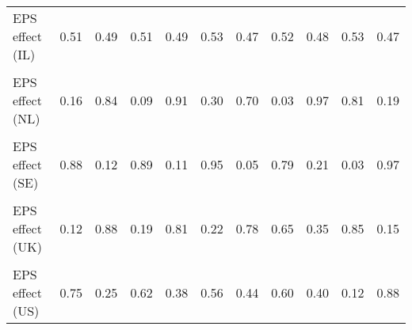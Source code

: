 \begin{table}
\begin{tabular}[t]{lrrrrrrrrrr}
EPS effect (IL) & 0.51 & 0.49 & 0.51 & 0.49 & 0.53 & 0.47 & 0.52 & 0.48 & 0.53 & 0.47\\
\cellcolor{gray!10}{Intercept (NL)} & \cellcolor{gray!10}{0.36} & \cellcolor{gray!10}{0.64} & \cellcolor{gray!10}{0.37} & \cellcolor{gray!10}{0.63} & \cellcolor{gray!10}{0.44} & \cellcolor{gray!10}{0.56} & \cellcolor{gray!10}{0.31} & \cellcolor{gray!10}{0.69} & \cellcolor{gray!10}{0.61} & \cellcolor{gray!10}{0.39}\\
EPS effect (NL) & 0.16 & 0.84 & 0.09 & 0.91 & 0.30 & 0.70 & 0.03 & 0.97 & 0.81 & 0.19\\
\cellcolor{gray!10}{Intercept (SE)} & \cellcolor{gray!10}{0.63} & \cellcolor{gray!10}{0.37} & \cellcolor{gray!10}{0.61} & \cellcolor{gray!10}{0.39} & \cellcolor{gray!10}{0.67} & \cellcolor{gray!10}{0.33} & \cellcolor{gray!10}{0.57} & \cellcolor{gray!10}{0.43} & \cellcolor{gray!10}{0.32} & \cellcolor{gray!10}{0.68}\\
EPS effect (SE) & 0.88 & 0.12 & 0.89 & 0.11 & 0.95 & 0.05 & 0.79 & 0.21 & 0.03 & 0.97\\
\cellcolor{gray!10}{Intercept (UK)} & \cellcolor{gray!10}{0.35} & \cellcolor{gray!10}{0.65} & \cellcolor{gray!10}{0.40} & \cellcolor{gray!10}{0.60} & \cellcolor{gray!10}{0.41} & \cellcolor{gray!10}{0.59} & \cellcolor{gray!10}{0.54} & \cellcolor{gray!10}{0.46} & \cellcolor{gray!10}{0.61} & \cellcolor{gray!10}{0.39}\\
EPS effect (UK) & 0.12 & 0.88 & 0.19 & 0.81 & 0.22 & 0.78 & 0.65 & 0.35 & 0.85 & 0.15\\
\cellcolor{gray!10}{Intercept (US)} & \cellcolor{gray!10}{0.62} & \cellcolor{gray!10}{0.38} & \cellcolor{gray!10}{0.54} & \cellcolor{gray!10}{0.46} & \cellcolor{gray!10}{0.52} & \cellcolor{gray!10}{0.48} & \cellcolor{gray!10}{0.54} & \cellcolor{gray!10}{0.46} & \cellcolor{gray!10}{0.32} & \cellcolor{gray!10}{0.68}\\
EPS effect (US) & 0.75 & 0.25 & 0.62 & 0.38 & 0.56 & 0.44 & 0.60 & 0.40 & 0.12 & 0.88\\
\bottomrule
\end{tabular}
\end{table}
